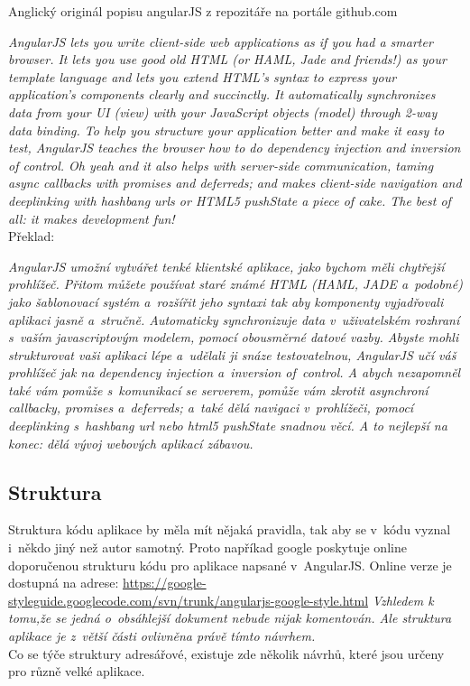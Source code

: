 \documentclass[a4paper,12pt,twoside,BCOR=10mm]{article}
\renewcommand{\it}[1]{\textit{#1}}    %
\begin{document}
Anglický originál popisu angularJS z repozitáře na portále github.com


\it{AngularJS lets you write client-side web applications as if you had a smarter browser. It lets you use good old HTML (or HAML, Jade and friends!) as your template language and lets you extend HTML’s syntax to express your application’s components clearly and succinctly. It automatically synchronizes data from your UI (view) with your JavaScript objects (model) through 2-way data binding. To help you structure your application better and make it easy to test, AngularJS teaches the browser how to do dependency injection and inversion of control. Oh yeah and it also helps with server-side communication, taming async callbacks with promises and deferreds; and makes client-side navigation and deeplinking with hashbang urls or HTML5 pushState a piece of cake. The best of all: it makes development fun!}\cite{angularGITHUB}\\

Překlad:

\it{AngularJS umožní vytvářet tenké klientské aplikace, jako bychom měli chytřejší prohlížeč. Přitom můžete používat staré známé HTML (HAML, JADE a~podobné) jako šablonovací systém a~rozšířit jeho syntaxi tak aby komponenty vyjadřovali aplikaci jasně a~stručně. Automaticky synchronizuje data v~uživatelském rozhraní s~vaším javascriptovým modelem, pomocí obousměrné datové vazby. Abyste mohli strukturovat vaši aplikaci lépe a~udělali ji snáze testovatelnou, AngularJS učí váš prohlížeč jak na dependency injection a~inversion of~control. A abych nezapomněl také vám pomůže s~komunikací se serverem, pomůže vám zkrotit asynchroní callbacky, promises a~deferreds; a~také dělá navigaci v~prohlížeči, pomocí deeplinking s~hashbang url nebo html5 pushState snadnou věcí. A to nejlepší na konec: dělá vývoj webových aplikací zábavou.}\cite{angularGITHUB}\\

\subsection{Struktura}
Struktura kódu aplikace by měla mít nějaká pravidla, tak aby se v~kódu vyznal i~někdo jiný než autor samotný. Proto napříkad google poskytuje online doporučenou strukturu kódu pro aplikace napsané v~AngularJS. Online verze je dostupná na adrese: \href{https://google-styleguide.googlecode.com/svn/trunk/angularjs-google-style.html}{https://google-styleguide.googlecode.com/svn/trunk/angularjs-google-style.html}
\it{Vzhledem k tomu,že se jedná o~obsáhlejší dokument nebude nijak komentován. Ale struktura aplikace je z~větší části ovlivněna právě tímto návrhem.}\\
Co se týče struktury adresářové, existuje zde několik návrhů, které jsou určeny pro různě velké aplikace.\\
\end{document}
